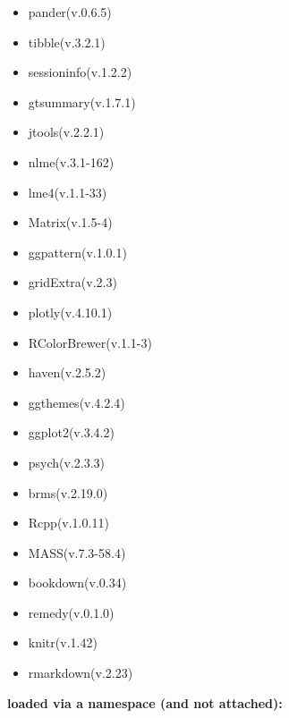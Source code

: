 \documentclass[
]{article}
\begin{document}
\begin{itemize}
\item
  pander(v.0.6.5)
\item
  tibble(v.3.2.1)
\item
  sessioninfo(v.1.2.2)
\item
  gtsummary(v.1.7.1)
\item
  jtools(v.2.2.1)
\item
  nlme(v.3.1-162)
\item
  lme4(v.1.1-33)
\item
  Matrix(v.1.5-4)
\item
  ggpattern(v.1.0.1)
\item
  gridExtra(v.2.3)
\item
  plotly(v.4.10.1)
\item
  RColorBrewer(v.1.1-3)
\item
  haven(v.2.5.2)
\item
  ggthemes(v.4.2.4)
\item
  ggplot2(v.3.4.2)
\item
  psych(v.2.3.3)
\item
  brms(v.2.19.0)
\item
  Rcpp(v.1.0.11)
\item
  MASS(v.7.3-58.4)
\item
  bookdown(v.0.34)
\item
  remedy(v.0.1.0)
\item
  knitr(v.1.42)
\item
  rmarkdown(v.2.23)
\end{itemize}

\textbf{loaded via a namespace (and not attached):}
\end{document}
